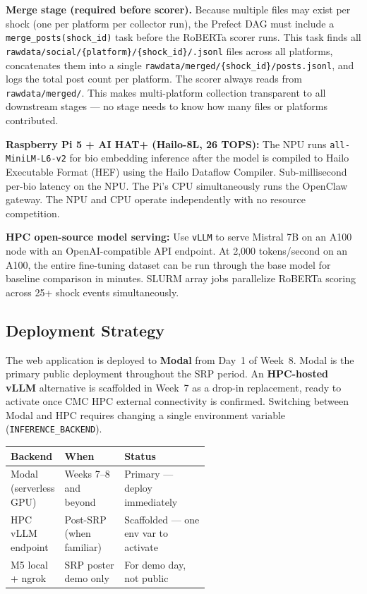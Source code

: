 \documentclass[11pt]{article}
\begin{document}
\medskip
\noindent\textbf{Merge stage (required before scorer).} Because multiple files may
exist per shock (one per platform per collector run), the Prefect DAG must include
a \texttt{merge\_posts(shock\_id)} task before the RoBERTa scorer runs. This task
finds all \texttt{rawdata/social/\{platform\}/\{shock\_id\}/\*.jsonl} files across
all platforms, concatenates them into a single
\texttt{rawdata/merged/\{shock\_id\}/posts.jsonl}, and logs the total post count
per platform. The scorer always reads from \texttt{rawdata/merged/}. This makes
multi-platform collection transparent to all downstream stages --- no stage needs
to know how many files or platforms contributed.

\medskip
\noindent\textbf{Raspberry Pi 5 + AI HAT+ (Hailo-8L, 26 TOPS):}
The NPU runs \texttt{all-MiniLM-L6-v2} for bio embedding inference after the model is compiled to Hailo Executable Format (HEF) using the Hailo Dataflow Compiler. Sub-millisecond per-bio latency on the NPU. The Pi's CPU simultaneously runs the OpenClaw gateway. The NPU and CPU operate independently with no resource competition.

\medskip
\noindent\textbf{HPC open-source model serving:}
Use \texttt{vLLM} to serve Mistral 7B on an A100 node with an OpenAI-compatible API endpoint. At 2,000 tokens/second on an A100, the entire fine-tuning dataset can be run through the base model for baseline comparison in minutes. SLURM array jobs parallelize RoBERTa scoring across 25+ shock events simultaneously.

\subsection*{Deployment Strategy}

The web application is deployed to \textbf{Modal} from Day~1 of Week~8. Modal is the primary public deployment throughout the SRP period. An \textbf{HPC-hosted vLLM} alternative is scaffolded in Week~7 as a drop-in replacement, ready to activate once CMC HPC external connectivity is confirmed. Switching between Modal and HPC requires changing a single environment variable (\texttt{INFERENCE\_BACKEND}).

\begin{center}
\begin{tabularx}{\linewidth}{p{0.26\linewidth}p{0.30\linewidth}X}
\toprule
\textbf{Backend} & \textbf{When} & \textbf{Status} \\
\midrule
Modal (serverless GPU) & Weeks 7--8 and beyond & Primary --- deploy immediately \\
HPC vLLM endpoint & Post-SRP (when familiar) & Scaffolded --- one env var to activate \\
M5 local + ngrok & SRP poster demo only & For demo day, not public \\
\bottomrule
\end{tabularx}
\end{center}
\end{document}
